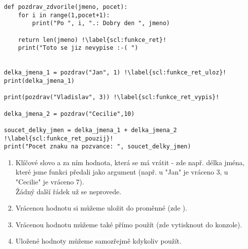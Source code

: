 \begin{minipage}[t]{.45\textwidth}
\begin{code}
\begin{verbatim}
def pozdrav_zdvorile(jmeno, pocet):
	for i in range(1,pocet+1):
		print("Po ", i, ".: Dobry den ", jmeno)
	
	return len(jmeno) !\label{scl:funkce_ret}!
	print("Toto se jiz nevypise :-( ")
	
	
delka_jmena_1 = pozdrav("Jan", 1) !\label{scl:funkce_ret_uloz}!
print(delka_jmena_1)

print(pozdrav("Vladislav", 3)) !\label{scl:funkce_ret_vypis}!

delka_jmena_2 = pozdrav("Cecilie",10) 

soucet_delky_jmen = delka_jmena_1 + delka_jmena_2 !\label{scl:funkce_ret_pouzij}!
print("Pocet znaku na pozvance: ", soucet_delky_jmen)
\end{verbatim}

\label{code:funkce_return}
\end{code}
\end{minipage}
\begin{minipage}[t]{.45\textwidth}
\begin{enumerate}
\vspace{2.5cm}
\item[ř. \ref{scl:funkce_ret}:] Klíčové slovo  a za ním hodnota, která se má vrátit - zde např. délka jména, které jsme funkci předali jako argument (např. u "Jan"  je vráceno 3, u "Cecilie" je vráceno 7).\\ Žádný další řádek už se neprovede.
\item[ř. \ref{scl:funkce_ret_uloz}:] Vrácenou hodnotu si můžeme uložit do proměnné (zde ).
\vspace{1cm}
\item[ř. \ref{scl:funkce_ret_vypis}:] Vrácenou hodnotu můžeme také přímo použít (zde vytisknout do konzole).
\item[ř. \ref{scl:funkce_ret_pouzij}:] Uložené hodnoty můžeme samozřejmě kdykoliv použít.
\end{enumerate}
\end{minipage}




